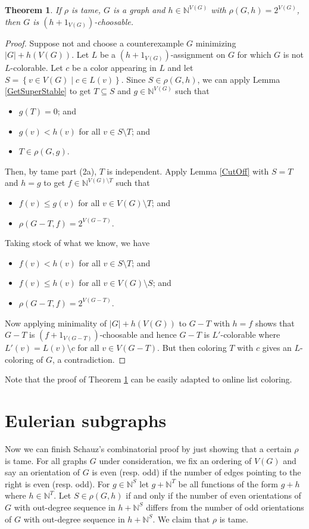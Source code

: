 \documentclass[12pt]{article}
\theoremstyle{plain}
\newtheorem{thm}{Theorem}[section]
\theoremstyle{definition}
\theoremstyle{remark}
\newcommand{\IN}{\mathbb{N}}
\newcommand{\setb}[3]{\left\{ #1 \in #2 \mid #3 \right\}}
\begin{document}
\begin{thm}\label{TameRhoWins}
	If $\rho$ is tame, $G$ is a graph and $h \in \IN^{V(G)}$ with $\rho(G, h) = 2^{V(G)}$, then $G$ is $(h + 1_{V(G)})$-choosable.
\end{thm}
\begin{proof}
	Suppose not and choose a counterexample $G$ minimizing $|G| + h(V(G))$.  Let $L$ be a $(h + 1_{V(G)})$-assignment on $G$ for which $G$ is not $L$-colorable.  Let $c$ be a color appearing in $L$ and let $S = \setb{v}{V(G)}{c \in L(v)}$.  Since $S \in \rho(G, h)$, we can apply Lemma \ref{GetSuperStable} to get $T \subseteq S$ and $g \in \IN^{V(G)}$ such that
	\begin{itemize}
		\item $g(T) = 0$; and
		\item $g(v) < h(v)$ for all $v \in S\setminus T$; and
		\item $T \in \rho(G, g)$.
	\end{itemize}
	Then, by tame part (2a), $T$ is independent.  Apply Lemma \ref{CutOff} with $S = T$ and $h = g$ to get $f \in \IN^{V(G) \setminus T}$ such that
		\begin{itemize}
			\item $f(v) \le g(v)$ for all $v \in V(G) \setminus T$; and
			\item $\rho(G - T, f) = 2^{V(G-T)}$.
		\end{itemize}
	Taking stock of what we know, we have
		\begin{itemize}
			\item $f(v) < h(v)$ for all $v \in S \setminus T$; and
			\item $f(v) \le h(v)$ for all $v \in V(G) \setminus S$; and
			\item $\rho(G - T, f) = 2^{V(G-T)}$.
		\end{itemize}
		
	Now applying minimality of $|G| + h(V(G))$ to $G-T$ with $h = f$ shows that $G-T$ is $(f + 1_{V(G-T)})$-choosable and hence $G-T$ is $L'$-colorable where $L'(v) = L(v) \setminus c$ for all $v \in V(G-T)$.  But then coloring $T$ with $c$ gives an $L$-coloring of $G$, a contradiction.
\end{proof}

Note that the proof of Theorem \ref{TameRhoWins} can be easily adapted to online list coloring.

\section{Eulerian subgraphs}
Now we can finish Schauz's combinatorial proof by just showing that a certain $\rho$ is tame.  For all graphs $G$ under consideration, we fix an ordering of $V(G)$ and say an orientation of $G$ is even (resp. odd) if the number of edges pointing to the right is even (resp. odd).  For $g \in \IN^S$ let $g + \IN^T$ be all functions of the form $g + h$ where $h \in \IN^T$. Let $S \in \rho(G, h)$ if and only if the number of even orientations of $G$ with out-degree sequence in $h + \IN^S$ differs from the number of odd orientations of $G$ with out-degree sequence in $h + \IN^S$.  We claim that $\rho$ is tame.  
\end{document}
